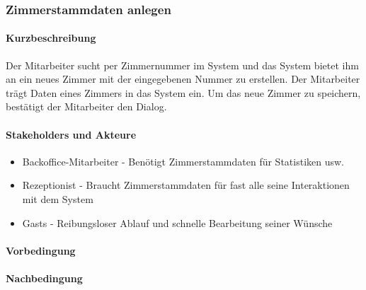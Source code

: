 \subsubsection{Zimmerstammdaten anlegen}

\paragraph{Kurzbeschreibung}
Der Mitarbeiter sucht per Zimmernummer im System und das System bietet ihm an ein neues Zimmer mit der eingegebenen Nummer zu erstellen. Der Mitarbeiter trägt Daten eines Zimmers in das System ein. Um das neue Zimmer zu speichern, bestätigt der Mitarbeiter den Dialog.

\paragraph{Stakeholders und Akteure}
\begin{itemize}
\item Backoffice-Mitarbeiter - Benötigt Zimmerstammdaten für Statistiken usw.
\item \Gls{Rezeptionist} - Braucht Zimmerstammdaten für fast alle seine Interaktionen mit dem System
\item \Glspl{Gast} - Reibungsloser Ablauf und schnelle Bearbeitung seiner Wünsche
\end{itemize}

\paragraph{Vorbedingung}


\paragraph{Nachbedingung}

